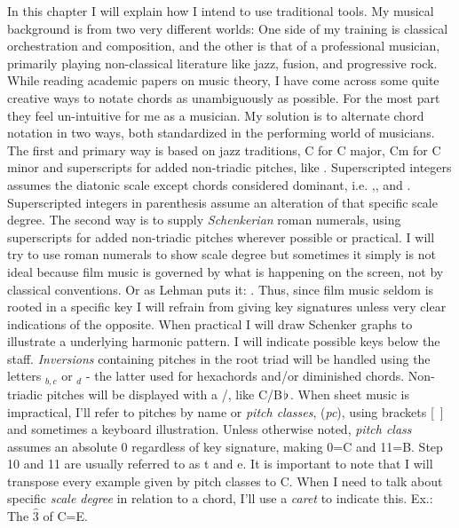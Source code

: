 In this chapter I will explain how I intend to use traditional tools. My musical background is from two very different worlds: One side of my training is classical orchestration and composition, and the other is that of a professional musician, primarily playing non-classical literature like jazz, fusion, and progressive rock. While reading academic papers on music theory, I have come across some quite creative ways to notate chords as unambiguously as possible. For the most part they feel un-intuitive for me as a musician. My solution is to alternate chord notation in two ways, both standardized in the performing world of musicians. The first and primary way is based on jazz traditions, C for C major, Cm for C minor and superscripts for added non-triadic pitches, like . Superscripted integers assumes the diatonic scale except chords considered dominant, i.e. ,,  and . Superscripted integers in parenthesis assume an alteration of that specific scale degree. The second way is to supply \textit{Schenkerian} roman numerals, using superscripts for added non-triadic pitches wherever possible or practical. I will try to use roman numerals to show scale degree but sometimes it simply is not ideal because film music is governed by what is happening on the screen, not by classical conventions. Or as Lehman puts it:  . Thus, since film music seldom is rooted in a specific key I will refrain from giving key signatures unless very clear indications of the opposite. When practical I will draw Schenker graphs to illustrate a underlying harmonic pattern. I will indicate possible keys below the staff. \textit{Inversions} containing pitches in the root triad will be handled using the letters \(_{b, c}\) or \(_{d}\) - the latter used for hexachords and/or diminished chords. Non-triadic pitches will be displayed with a /, like C/B\(\hspace*{0.18ex}\flat\hspace*{0.18ex}\). When sheet music is impractical, I'll refer to pitches by name or \textit{pitch classes}, (\textit{pc}), using brackets [~] and sometimes a keyboard illustration. Unless otherwise noted, \textit{pitch class} assumes an absolute 0 regardless of key signature, making 0=C and 11=B. Step 10 and 11 are usually referred to as t and e. It is important to note that I will transpose every example given by pitch classes to C. When I need to talk about specific \textit{scale degree} in relation to a chord, I'll use a \textit{caret} to indicate this. Ex.: The \(\hat{3}\) of C=E.
